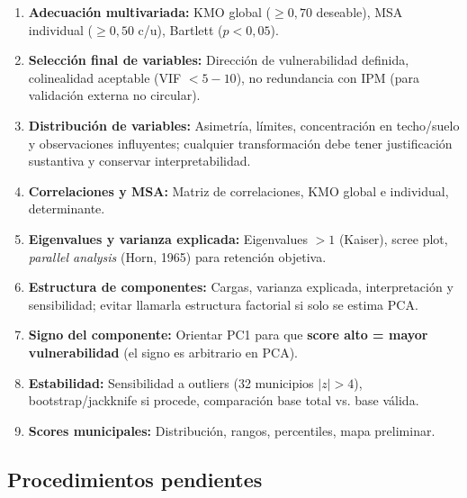 \begin{enumerate}
    \item \textbf{Adecuación multivariada:} KMO global ($\ge 0,70$ deseable), MSA individual ($\ge 0,50$ c/u), Bartlett ($p<0,05$).
    \item \textbf{Selección final de variables:} Dirección de vulnerabilidad definida, colinealidad aceptable (VIF $< 5-10$), no redundancia con IPM (para validación externa no circular).
    \item \textbf{Distribución de variables:} Asimetría, límites, concentración en techo/suelo y observaciones influyentes; cualquier transformación debe tener justificación sustantiva y conservar interpretabilidad.
    \item \textbf{Correlaciones y MSA:} Matriz de correlaciones, KMO global e individual, determinante.
    \item \textbf{Eigenvalues y varianza explicada:} Eigenvalues $> 1$ (Kaiser), scree plot, \textit{parallel analysis} (Horn, 1965) para retención objetiva.
    \item \textbf{Estructura de componentes:} Cargas, varianza explicada, interpretación y sensibilidad; evitar llamarla estructura factorial si solo se estima PCA.
    \item \textbf{Signo del componente:} Orientar PC1 para que \textbf{score alto = mayor vulnerabilidad} (el signo es arbitrario en PCA).
    \item \textbf{Estabilidad:} Sensibilidad a outliers (32 municipios $|z|>4$), bootstrap/jackknife si procede, comparación base total vs. base válida.
    \item \textbf{Scores municipales:} Distribución, rangos, percentiles, mapa preliminar.
\end{enumerate}

\subsection{Procedimientos pendientes}
\label{sec:procedimientos_pendientes_pca}

